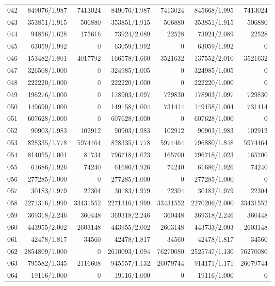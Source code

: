 \begin{longtable}{crrrrrr}
042 & 849076/1.987 & 7413024 & 849076/1.987 & 7413024 & 845668/1.995 & 7413024 \\
043 & 353851/1.915 & 506880 & 353851/1.915 & 506880 & 353851/1.915 & 506880 \\
044 & 94856/1.628 & 175616 & 73924/2.089 & 22528 & 73924/2.089 & 22528 \\
045 & 63059/1.992 & 0 & 63059/1.992 & 0 & 63059/1.992 & 0 \\
046 & 153482/1.801 & 4017792 & 166578/1.660 & 3521632 & 137552/2.010 & 3521632 \\
047 & 326508/1.000 & 0 & 324985/1.005 & 0 & 324985/1.005 & 0 \\
048 & 222220/1.000 & 0 & 222220/1.000 & 0 & 222220/1.000 & 0 \\
049 & 196276/1.000 & 0 & 178903/1.097 & 729830 & 178903/1.097 & 729830 \\
050 & 149690/1.000 & 0 & 149158/1.004 & 731414 & 149158/1.004 & 731414 \\
051 & 607628/1.000 & 0 & 607628/1.000 & 0 & 607628/1.000 & 0 \\
052 & 90903/1.983 & 102912 & 90903/1.983 & 102912 & 90903/1.983 & 102912 \\
053 & 828335/1.778 & 5974464 & 828335/1.778 & 5974464 & 796880/1.848 & 5974464 \\
054 & 814055/1.001 & 81734 & 796718/1.023 & 165700 & 796718/1.023 & 165700 \\
055 & 61686/1.926 & 74240 & 61686/1.926 & 74240 & 61686/1.926 & 74240 \\
056 & 277285/1.000 & 0 & 277285/1.000 & 0 & 277285/1.000 & 0 \\
057 & 30183/1.979 & 22304 & 30183/1.979 & 22304 & 30183/1.979 & 22304 \\
058 & 2271316/1.999 & 33431552 & 2271316/1.999 & 33431552 & 2270206/2.000 & 33431552 \\
059 & 369318/2.246 & 360448 & 369318/2.246 & 360448 & 369318/2.246 & 360448 \\
060 & 443955/2.002 & 2603148 & 443955/2.002 & 2603148 & 443733/2.003 & 2603148 \\
061 & 42478/1.817 & 34560 & 42478/1.817 & 34560 & 42478/1.817 & 34560 \\
062 & 2854809/1.000 & 0 & 2610093/1.094 & 76270080 & 2525747/1.130 & 76270080 \\
063 & 795582/1.345 & 2116608 & 945557/1.132 & 26079744 & 914171/1.171 & 26079744 \\
064 & 19116/1.000 & 0 & 19116/1.000 & 0 & 19116/1.000 & 0 \\

\end{longtable}
